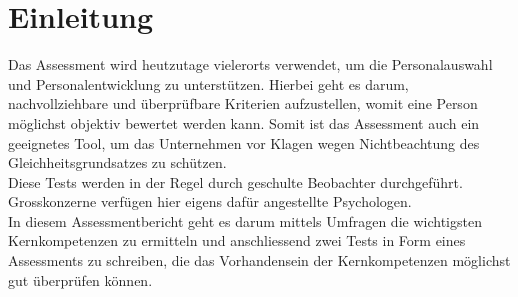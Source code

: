 
\chapter{Einleitung}

Das Assessment wird heutzutage vielerorts verwendet, um die Personalauswahl und Personalentwicklung zu unterstützen. Hierbei geht es darum, nachvollziehbare und überprüfbare Kriterien aufzustellen, womit eine Person möglichst objektiv bewertet werden kann. Somit ist das Assessment auch ein geeignetes Tool, um das Unternehmen vor Klagen wegen Nichtbeachtung des Gleichheitsgrundsatzes zu schützen. \\ 
Diese Tests werden in der Regel durch geschulte Beobachter durchgeführt. Grosskonzerne verfügen hier eigens dafür angestellte Psychologen. \\
In diesem Assessmentbericht geht es darum mittels Umfragen die wichtigsten Kernkompetenzen zu ermitteln und anschliessend zwei Tests in Form eines Assessments zu schreiben, die das Vorhandensein der Kernkompetenzen möglichst gut überprüfen können.
  

